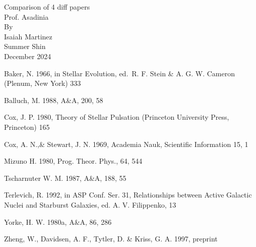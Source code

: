 \documentclass[a4paper,12pt]{article}
\begin{document}
    \begin{titlepage}
        \centering
        Comparison of 4 diff papers\\
        [1.5in]
        
        Prof. Asadinia\\
        [1.5in]
        
        By\\
        Isaiah Martinez\\
        Summer Shin\\

        \vspace{\fill}
        December 2024\\
    \end{titlepage}

    
    
    
    

    \begin{thebibliography}{}

         Baker, N. 1966,
            in Stellar Evolution,
            ed.\ R. F. Stein \& A. G. W. Cameron
            (Plenum, New York) 333

         Balluch, M. 1988,
            A\&A, 200, 58

         Cox, J. P. 1980,
            Theory of Stellar Pulsation
            (Princeton University Press, Princeton) 165

         Cox, A. N.,\& Stewart, J. N. 1969,
            Academia Nauk, Scientific Information 15, 1

         Mizuno H. 1980,
            Prog. Theor. Phys., 64, 544
        
         Tscharnuter W. M. 1987,
            A\&A, 188, 55
        
         Terlevich, R. 1992, in ASP Conf. Ser. 31, 
            Relationships between Active Galactic Nuclei and Starburst Galaxies, 
            ed. A. V. Filippenko, 13

         Yorke, H. W. 1980a,
            A\&A, 86, 286

         Zheng, W., Davidsen, A. F., Tytler, D. \& Kriss, G. A.
            1997, preprint

    \end{thebibliography}
\end{document}
